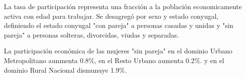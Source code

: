 La tasa de participación representa una fracción a la población economicamente activa con edad para trabajar. Se desagregó por sexo y estado conyugal, definiendo el estado conyugal "con pareja" a personas casadas y unidas y "sin pareja" a personas solteras, divorcidas, viudas y separadas.  

La participación económica de las mujeres "sin pareja" en el dominio Urbano Metropolitano aunmenta 0.8\%, en el Resto Urbano aumenta 0.2\%. y en el dominio Rural  Nacional dismunuye 1.9\%.
